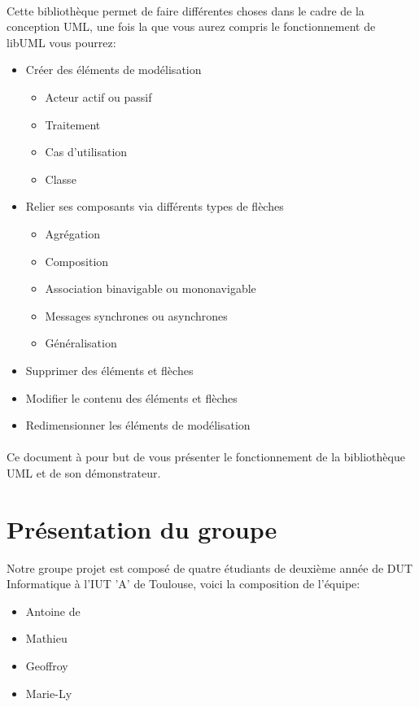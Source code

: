 	\paragraph{}	
	Cette bibliothèque permet de faire différentes choses dans le cadre de la conception UML, une fois la
	que vous aurez compris le fonctionnement de libUML vous pourrez:
	\begin{itemize}
		\item Créer des éléments de modélisation 
			\begin{itemize}
				\item Acteur actif ou passif
				\item Traitement
				\item Cas d'utilisation
				\item Classe
			\end{itemize}
		\item Relier ses composants via différents types de flèches
			\begin{itemize}
				\item Agrégation
				\item Composition
				\item Association binavigable ou mononavigable
				\item Messages synchrones ou asynchrones
				\item Généralisation
			\end{itemize}
		\item Supprimer des éléments et flèches
		\item Modifier le contenu des éléments et flèches
		\item Redimensionner les éléments de modélisation
	\end{itemize}
	\paragraph{}
Ce document à pour but de vous présenter le fonctionnement de la bibliothèque UML et de son démonstrateur. 

\section*{Présentation du groupe}
	Notre groupe projet est composé de quatre étudiants de deuxième année de DUT Informatique à l'IUT 'A' de Toulouse, voici la composition de l'équipe: 
	\begin{itemize}
		\item Antoine de  
		\item Mathieu  
		\item Geoffroy 
		\item Marie-Ly  
	\end{itemize}

